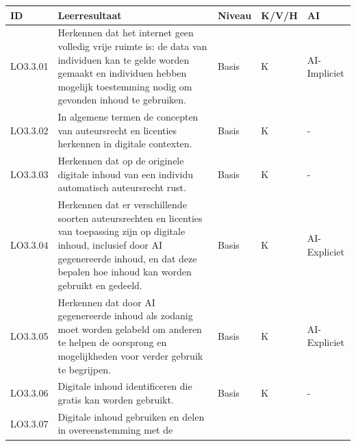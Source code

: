 \documentclass[
  dutch,
  letterpaper,
  DIV=11,
  numbers=noendperiod]{scrartcl}
\begin{document}
\begin{longtable}[]{@{}
  >{\centering\arraybackslash}p{}
  >{\centering\arraybackslash}p{}
  >{\centering\arraybackslash}p{}
  >{\centering\arraybackslash}p{}
  >{\centering\arraybackslash}p{}@{}}
\toprule\noalign{}
\begin{minipage}[b]{\linewidth}\centering
ID
\end{minipage} & \begin{minipage}[b]{\linewidth}\centering
Leerresultaat
\end{minipage} & \begin{minipage}[b]{\linewidth}\centering
Niveau
\end{minipage} & \begin{minipage}[b]{\linewidth}\centering
K/V/H
\end{minipage} & \begin{minipage}[b]{\linewidth}\centering
AI
\end{minipage} \\
\midrule\noalign{}
\endhead
\bottomrule\noalign{}
\endlastfoot
LO3.3.01 & Herkennen dat het internet geen volledig vrije ruimte is: de
data van individuen kan te gelde worden gemaakt en individuen hebben
mogelijk toestemming nodig om gevonden inhoud te gebruiken. & Basis & K
& AI-Impliciet \\
LO3.3.02 & In algemene termen de concepten van auteursrecht en licenties
herkennen in digitale contexten. & Basis & K & - \\
LO3.3.03 & Herkennen dat op de originele digitale inhoud van een
individu automatisch auteursrecht rust. & Basis & K & - \\
LO3.3.04 & Herkennen dat er verschillende soorten auteursrechten en
licenties van toepassing zijn op digitale inhoud, inclusief door AI
gegenereerde inhoud, en dat deze bepalen hoe inhoud kan worden gebruikt
en gedeeld. & Basis & K & AI-Expliciet \\
LO3.3.05 & Herkennen dat door AI gegenereerde inhoud als zodanig moet
worden gelabeld om anderen te helpen de oorsprong en mogelijkheden voor
verder gebruik te begrijpen. & Basis & K & AI-Expliciet \\
LO3.3.06 & Digitale inhoud identificeren die gratis kan worden gebruikt.
& Basis & K & - \\
LO3.3.07 & Digitale inhoud gebruiken en delen in overeenstemming met de

\end{longtable}
\end{document}
